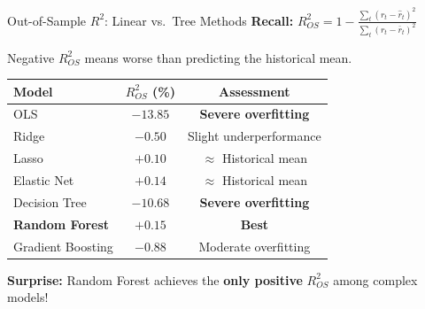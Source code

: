 \documentclass[10pt]{beamer}
\newcommand{\highlight}[1]{\textcolor{AccentOrange}{\textbf{#1}}}
\newcommand{\highlightgreen}[1]{\textcolor{AccentGreen}{\textbf{#1}}}
\newcommand{\highlightred}[1]{\textcolor{AccentRed}{\textbf{#1}}}
\begin{document}
\begin{frame}{Out-of-Sample $R^2$: Linear vs.\ Tree Methods}
\textbf{Recall:} $R^2_{OS} = 1 - \frac{\sum_t(r_t - \widehat{r}_t)^2}{\sum_t(r_t - \bar{r}_t)^2}$

  \vspace{0.5em}
  Negative $R^2_{OS}$ means worse than predicting the historical mean.

  \vspace{0.5em}
  \begin{center}
  \begin{tabular}{lcc}
    \toprule
    \textbf{Model} & \textbf{$R^2_{OS}$ (\%)} & \textbf{Assessment} \\
    \midrule
    OLS & $-13.85$ & \highlightred{Severe overfitting} \\
    Ridge & $-0.50$ & Slight underperformance \\
    Lasso & $+0.10$ & $\approx$ Historical mean \\
    Elastic Net & $+0.14$ & $\approx$ Historical mean \\
    \midrule
    Decision Tree & $-10.68$ & \highlightred{Severe overfitting} \\
    \highlightgreen{Random Forest} & $\mathbf{+0.15}$ & \highlightgreen{Best} \\
    Gradient Boosting & $-0.88$ & Moderate overfitting \\
    \bottomrule
  \end{tabular}
  \end{center}

  \vspace{0.3em}
  \textbf{Surprise:} Random Forest achieves the \highlight{only positive} $R^2_{OS}$ among complex models!
\end{frame}

\end{document}
